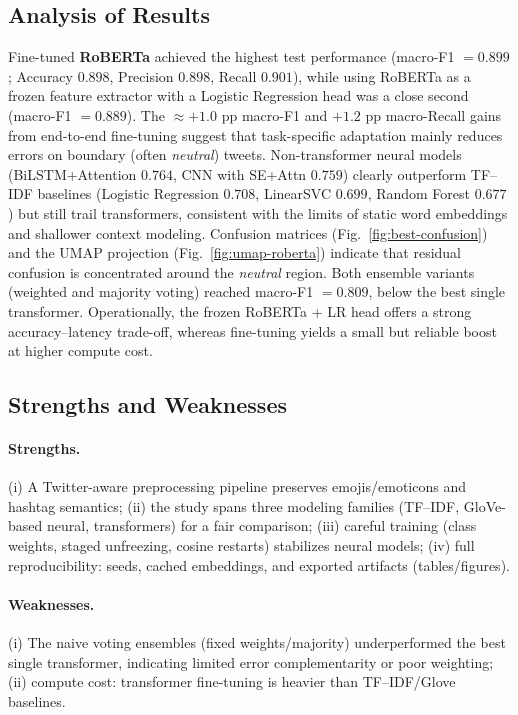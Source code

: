 \documentclass[10pt]{article}
\begin{document}
\subsection{Analysis of Results}
Fine-tuned \textbf{RoBERTa} achieved the highest test performance (macro-F1 $=0.899$; Accuracy $0.898$, Precision $0.898$, Recall $0.901$), while using RoBERTa as a frozen feature extractor with a Logistic Regression head was a close second (macro-F1 $=0.889$). The $\approx +1.0$ pp macro-F1 and $+1.2$ pp macro-Recall gains from end-to-end fine-tuning suggest that task-specific adaptation mainly reduces errors on boundary (often \emph{neutral}) tweets. Non-transformer neural models (BiLSTM+Attention $0.764$, CNN with SE+Attn $0.759$) clearly outperform TF--IDF baselines (Logistic Regression $0.708$, LinearSVC $0.699$, Random Forest $0.677$) but still trail transformers, consistent with the limits of static word embeddings and shallower context modeling. Confusion matrices (Fig.~\ref{fig:best-confusion}) and the UMAP projection (Fig.~\ref{fig:umap-roberta}) indicate that residual confusion is concentrated around the \emph{neutral} region.
Both ensemble variants (weighted and majority voting) reached macro-F1 $=0.809$, below the best single transformer. Operationally, the frozen RoBERTa + LR head offers a strong accuracy--latency trade-off, whereas fine-tuning yields a small but reliable boost at higher compute cost.

\subsection{Strengths and Weaknesses}
\paragraph{Strengths.} 
(i) A Twitter-aware preprocessing pipeline preserves emojis/emoticons and hashtag semantics; (ii) the study spans three modeling families (TF--IDF, GloVe-based neural, transformers) for a fair comparison; (iii) careful training (class weights, staged unfreezing, cosine restarts) stabilizes neural models; (iv) full reproducibility: seeds, cached embeddings, and exported artifacts (tables/figures).
\paragraph{Weaknesses.}
(i) The naive voting ensembles (fixed weights/majority) underperformed the best single transformer, indicating limited error complementarity or poor weighting; (ii) compute cost: transformer fine-tuning is heavier than TF--IDF/Glove baselines.
\end{document}
